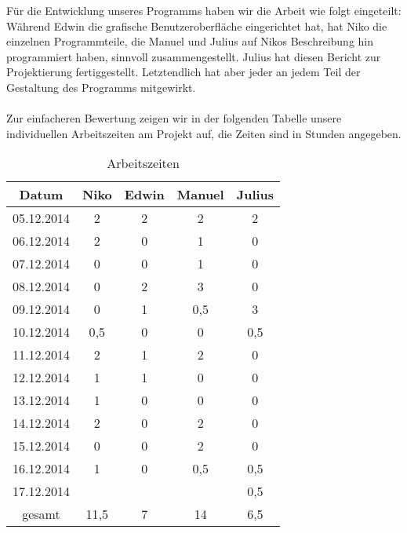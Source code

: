 \documentclass[a4paper, 11pt, titlepage]{article}
\begin{document}
Für die Entwicklung unseres Programms haben wir die Arbeit wie folgt eingeteilt: Während Edwin die grafische Benutzeroberfläche eingerichtet hat, hat Niko die einzelnen Programmteile, die Manuel und Julius auf Nikos Beschreibung hin programmiert haben, sinnvoll zusammengestellt. Julius hat diesen Bericht zur Projektierung fertiggestellt. Letztendlich hat aber jeder an jedem Teil der Gestaltung des Programms mitgewirkt.\\\\
Zur einfacheren Bewertung zeigen wir in der folgenden Tabelle unsere individuellen Arbeitszeiten am Projekt auf, die Zeiten sind in Stunden angegeben.
\begin{table}[htbp]
\centering
\begin{tabular}{|c||c|c|c|c|}
\hline
Datum & Niko & Edwin & Manuel & Julius \\
\hline
\hline
05.12.2014 & 2 & 2 & 2 & 2 \\
\hline
06.12.2014 & 2 & 0 & 1 & 0 \\
\hline
07.12.2014 & 0 & 0 & 1 & 0 \\
\hline
08.12.2014 & 0 & 2 & 3 & 0 \\
\hline
09.12.2014 & 0 & 1 & 0{,}5 & 3 \\
\hline
10.12.2014 & 0{,}5 & 0 & 0 & 0{,}5 \\
\hline
11.12.2014 & 2 & 1 & 2 & 0 \\
\hline
12.12.2014 & 1 & 1 & 0 & 0 \\
\hline
13.12.2014 & 1 & 0 & 0 & 0 \\
\hline
14.12.2014 & 2 & 0 & 2 & 0 \\
\hline
15.12.2014 & 0 & 0 & 2 & 0 \\
\hline
16.12.2014 & 1 & 0 & 0{,}5 & 0{,}5\\
\hline
17.12.2014 &  &  &  & 0{,}5 \\
\hline
\hline
gesamt & 11{,}5 & 7 & 14 & 6,5 \\
\hline
\end{tabular}
\caption{Arbeitszeiten}
\end{table}
\end{document}
